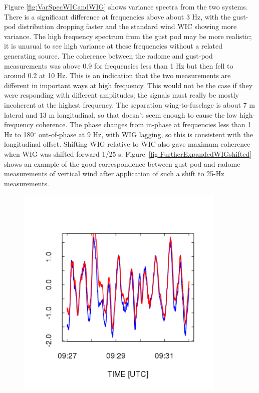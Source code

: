 \documentclass[12pt,twoside,english]{article}\usepackage[]{graphicx}\usepackage[]{color}
\begin{document}
{{Figure \ref{fig:VarSpecWICandWIG} shows variance spectra from the two systems. There is a significant difference at frequencies above about 3 Hz, with the gust-pod distribution dropping faster and the standard wind WIC showing more variance. The high frequency spectrum from the gust pod may be more realistic; it is unusual to see high variance at these frequencies without a related generating source. The coherence between the radome and gust-pod measurements was above 0.9 for frequencies less than 1 Hz but then fell to around 0.2 at 10 Hz. This is an indication that the two measurements are different in important ways at high frequency. This would not be the case if they were responding with different amplitudes; the signals must really be mostly incoherent at the highest frequency. The separation wing-to-fuselage is about 7 m lateral and 13 m longitudinal, so that doesn't seem enough to cause the low high-frequency coherence. The phase changes from in-phase at frequencies less than 1 Hz to 180$^{\circ}$ out-of-phase at 9 Hz, with WIG lagging, so this is consistent with the longitudinal offset. Shifting WIG relative to WIC also gave maximum coherence when WIG was shifted forward 1/25 s. Figure~\ref{fig:FurtherExpandedWIGshifted} shows an example of the good correspondence between gust-pod and radome measurements of vertical wind after application of such a shift to 25-Hz measurements. 

\begin{figure}
\noindent \begin{centering}
\includegraphics[width=10cm]{SpecialGraphics/GPrf11WIGshiftM1.png}  
\par\end{centering}


\end{figure}}}
\end{document}
